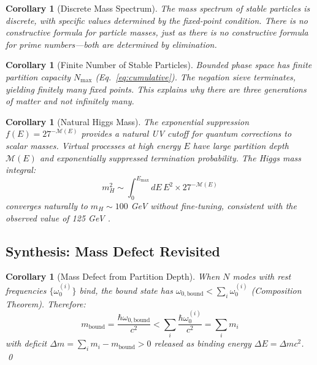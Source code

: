 \documentclass[twocolumn,10pt,a4paper]{article}
\newtheorem{corollary}[theorem]{Corollary}
\theoremstyle{definition}
\theoremstyle{remark}
\newcommand{\Depth}{\mathcal{M}}
\begin{document}
\begin{corollary}[Discrete Mass Spectrum]
The mass spectrum of stable particles is discrete, with specific values determined by the fixed-point condition. There is no constructive formula for particle masses, just as there is no constructive formula for prime numbers---both are determined by elimination.
\end{corollary}

\begin{corollary}[Finite Number of Stable Particles]
Bounded phase space has finite partition capacity $N_{\max}$ (Eq.~\ref{eq:cumulative}). The negation sieve terminates, yielding finitely many fixed points. This explains why there are three generations of matter and not infinitely many.
\end{corollary}

\begin{corollary}[Natural Higgs Mass]
The exponential suppression $f(E) = 27^{-\Depth(E)}$ provides a natural UV cutoff for quantum corrections to scalar masses. Virtual processes at high energy $E$ have large partition depth $\Depth(E)$ and exponentially suppressed termination probability. The Higgs mass integral:
\begin{equation}
    m_H^2 \sim \int_0^{E_{\max}} dE \, E^2 \times 27^{-\Depth(E)}
\end{equation}
converges naturally to $m_H \sim 100$ GeV without fine-tuning, consistent with the observed value of 125 GeV \citep{atlas2012,cms2012}.
\end{corollary}

\subsection{Synthesis: Mass Defect Revisited}

\begin{corollary}[Mass Defect from Partition Depth]
\label{cor:mass-defect}
When $N$ modes with rest frequencies $\{\omega_0^{(i)}\}$ bind, the bound state has $\omega_{0,\text{bound}} < \sum_i \omega_0^{(i)}$ (Composition Theorem). Therefore:
\begin{equation}
    m_{\text{bound}} = \frac{\hbar\omega_{0,\text{bound}}}{c^2} < \sum_i \frac{\hbar\omega_0^{(i)}}{c^2} = \sum_i m_i
\end{equation}
with deficit $\Delta m = \sum_i m_i - m_{\text{bound}} > 0$ released as binding energy $\Delta E = \Delta mc^2$. \qed
\end{corollary}
\end{document}
